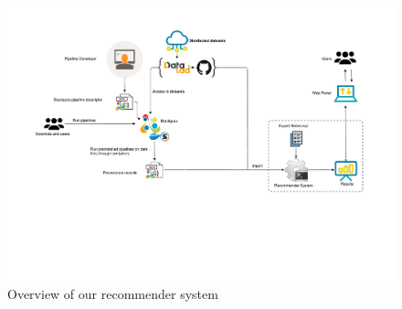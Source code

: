 \documentclass[conference]{IEEEtran}
\begin{document}
\begin{figure}[ht]
  \centering
  \includegraphics[width=\textwidth]{figures/Methodology.pdf}%
  \caption{Overview of our recommender system }
  \label{fig:method}
  \end{figure}  
\end{document}
